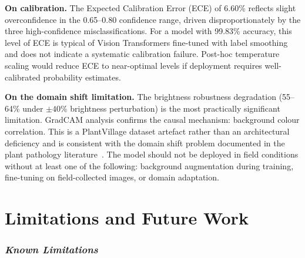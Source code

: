 \documentclass[conference]{IEEEtran}
\begin{document}
\textbf{On calibration.} The Expected Calibration Error (ECE) of 6.60\% reflects slight overconfidence in the 0.65--0.80 confidence range, driven disproportionately by the three high-confidence misclassifications. For a model with 99.83\% accuracy, this level of ECE is typical of Vision Transformers fine-tuned with label smoothing and does not indicate a systematic calibration failure. Post-hoc temperature scaling would reduce ECE to near-optimal levels if deployment requires well-calibrated probability estimates.

\textbf{On the domain shift limitation.} The brightness robustness degradation (55--64\% under $\pm40\%$ brightness perturbation) is the most practically significant limitation. GradCAM analysis confirms the causal mechanism: background colour correlation. This is a PlantVillage dataset artefact rather than an architectural deficiency and is consistent with the domain shift problem documented in the plant pathology literature~\cite{18}. The model should not be deployed in field conditions without at least one of the following: background augmentation during training, fine-tuning on field-collected images, or domain adaptation.





\section{Limitations and Future Work}

\subsubsection{\textit{Known Limitations}}
\end{document}
